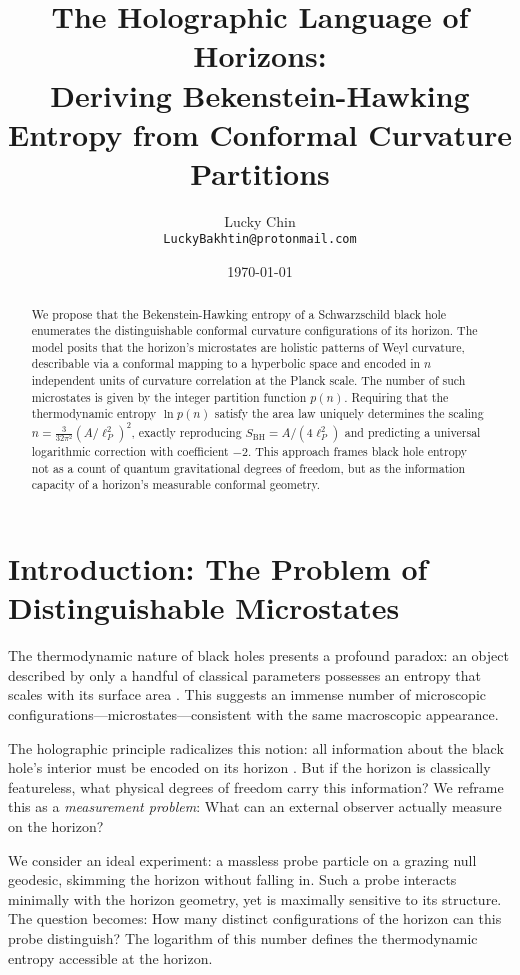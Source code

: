 \documentclass[12pt, letterpaper]{article}
\title{The Holographic Language of Horizons: \\ Deriving Bekenstein-Hawking Entropy from Conformal Curvature Partitions}
\author{Lucky Chin \\ \normalsize \texttt{LuckyBakhtin@protonmail.com}}
\date{\today}
\begin{document}
\maketitle

\begin{abstract}
We propose that the Bekenstein-Hawking entropy of a Schwarzschild black hole enumerates the distinguishable conformal curvature configurations of its horizon. The model posits that the horizon's microstates are holistic patterns of Weyl curvature, describable via a conformal mapping to a hyperbolic space and encoded in $n$ independent units of curvature correlation at the Planck scale. The number of such microstates is given by the integer partition function $p(n)$. Requiring that the thermodynamic entropy $\ln p(n)$ satisfy the area law uniquely determines the scaling $n = \frac{3}{32\pi^2} (A/\ell_P^2)^2$, exactly reproducing $S_{\text{BH}} = A/(4\ell_P^2)$ and predicting a universal logarithmic correction with coefficient $-2$. This approach frames black hole entropy not as a count of quantum gravitational degrees of freedom, but as the information capacity of a horizon's measurable conformal geometry.
\end{abstract}

\section{Introduction: The Problem of Distinguishable Microstates}
\label{sec:intro}

The thermodynamic nature of black holes presents a profound paradox: an object described by only a handful of classical parameters possesses an entropy that scales with its surface area \cite{bekenstein1973, hawking1975}. This suggests an immense number of microscopic configurations—microstates—consistent with the same macroscopic appearance.

The holographic principle radicalizes this notion: all information about the black hole's interior must be encoded on its horizon \cite{tHooft1993, Susskind1995}. But if the horizon is classically featureless, what physical degrees of freedom carry this information? We reframe this as a \emph{measurement problem}: What can an external observer actually measure on the horizon?

We consider an ideal experiment: a massless probe particle on a grazing null geodesic, skimming the horizon without falling in. Such a probe interacts minimally with the horizon geometry, yet is maximally sensitive to its structure. The question becomes: How many distinct configurations of the horizon can this probe distinguish? The logarithm of this number defines the thermodynamic entropy accessible at the horizon.
\end{document}
